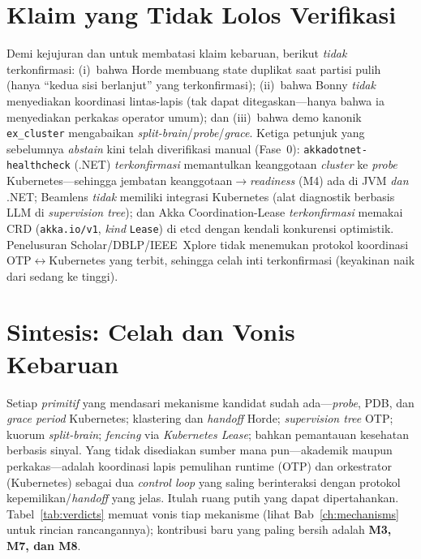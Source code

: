 \section{Klaim yang Tidak Lolos Verifikasi}
\label{sec:lit-batas}
Demi kejujuran dan untuk membatasi klaim kebaruan, berikut \emph{tidak} terkonfirmasi:
(i)~bahwa Horde membuang state duplikat saat partisi pulih (hanya ``kedua sisi berlanjut''
yang terkonfirmasi); (ii)~bahwa Bonny \emph{tidak} menyediakan koordinasi lintas-lapis
(tak dapat ditegaskan---hanya bahwa ia menyediakan perkakas operator umum); dan (iii)~bahwa
demo kanonik \texttt{ex\_cluster} mengabaikan \emph{split-brain}/\emph{probe}/\emph{grace}.
Ketiga petunjuk yang sebelumnya \emph{abstain} kini telah diverifikasi manual (Fase~0):
\texttt{akkadotnet-healthcheck} (.NET) \emph{terkonfirmasi} memantulkan keanggotaan
\emph{cluster} ke \emph{probe} Kubernetes---sehingga jembatan keanggotaan$\rightarrow$\emph{readiness}
(M4) ada di JVM \emph{dan} .NET; Beamlens \emph{tidak} memiliki integrasi Kubernetes (alat
diagnostik berbasis LLM di \emph{supervision tree}); dan Akka Coordination-Lease
\emph{terkonfirmasi} memakai CRD (\texttt{akka.io/v1}, \emph{kind} \texttt{Lease}) di etcd
dengan kendali konkurensi optimistik. Penelusuran Scholar/DBLP/IEEE~Xplore tidak menemukan
protokol koordinasi OTP$\leftrightarrow$Kubernetes yang terbit, sehingga celah inti
terkonfirmasi (keyakinan naik dari sedang ke tinggi).

\section{Sintesis: Celah dan Vonis Kebaruan}
\label{sec:lit-synth}
Setiap \emph{primitif} yang mendasari mekanisme kandidat sudah ada---\emph{probe}, PDB, dan
\emph{grace period} Kubernetes; klastering dan \emph{handoff} Horde; \emph{supervision
tree} OTP; kuorum \emph{split-brain}; \emph{fencing} via \emph{Kubernetes Lease}; bahkan
pemantauan kesehatan berbasis sinyal. Yang tidak disediakan sumber mana pun---akademik
maupun perkakas---adalah koordinasi lapis pemulihan runtime (OTP) dan orkestrator
(Kubernetes) sebagai dua \emph{control loop} yang saling berinteraksi dengan protokol
kepemilikan/\emph{handoff} yang jelas. Itulah ruang putih yang dapat dipertahankan.
Tabel~\ref{tab:verdicts} memuat vonis tiap mekanisme (lihat Bab~\ref{ch:mechanisms} untuk
rincian rancangannya); kontribusi baru yang paling bersih adalah \textbf{M3, M7, dan M8}.

